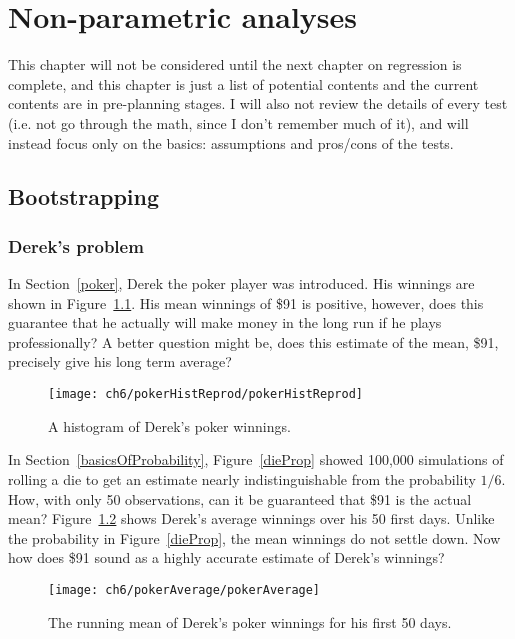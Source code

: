 \chapter{Non-parametric analyses}
\label{nonParametric}
This chapter will not be considered until the next chapter on regression is complete, and this chapter is just a list of potential contents and the current contents are in pre-planning stages. I will also not review the details of every test (i.e. not go through the math, since I don't remember much of it), and will instead focus only on the basics: assumptions and pros/cons of the tests.

\section{Bootstrapping}
\label{bootstrap}

\subsection{Derek's problem}

In Section~\ref{poker}, Derek the poker player was introduced. His winnings are shown in Figure~\ref{pokerHistReprod}. His mean winnings of \$91 is positive, however, does this guarantee that he actually will make money in the long run if he plays professionally? A better question might be, does this estimate of the mean, \$91, precisely give his long term average?
\begin{figure}
\centering
\texttt{[image: ch6/pokerHistReprod/pokerHistReprod]}
\caption{A histogram of Derek's poker winnings.}
\label{pokerHistReprod}
\end{figure}

In Section~\ref{basicsOfProbability}, Figure~\ref{dieProp} showed 100,000 simulations of rolling a die to get an estimate nearly indistinguishable from the probability $1/6$. How, with only 50 observations, can it be guaranteed that \$91 is the actual mean? Figure~\ref{pokerAverage} shows Derek's  average winnings over his 50 first days. Unlike the probability in Figure~\ref{dieProp}, the mean winnings do not settle down. Now how does \$91 sound as a highly accurate estimate of Derek's winnings?
\begin{figure}
\centering
\texttt{[image: ch6/pokerAverage/pokerAverage]}
\caption{The running mean of Derek's poker winnings for his first 50 days.}
\label{pokerAverage}
\end{figure}


